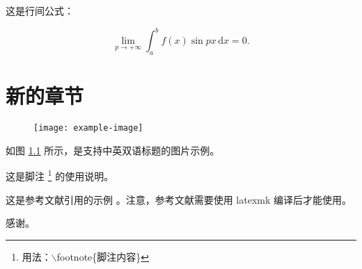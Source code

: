 \documentclass{ecnuthesis}
\begin{document}
这是行间公式：

\[
  \lim_{p\to+\infty}\int_{a}^{b}f(x)\sin{px}\,\mathrm{d}x = 0.
\]

\chapter{新的章节}

\blindtext

\blindtext

\blindtext

\blindtext

\begin{figure}
    \centering
    \texttt{[image: example-image]}
    \label{example}
  \end{figure}

如图 \ref{example} 所示，是支持中英双语标题的图片示例。

这是脚注 \footnote{用法：\ttfamily$\backslash$footnote\{脚注内容\}} 的使用说明。

这是参考文献引用的示例 \cite{Yang_Hy200215, Zheng_wb200108, Altman1997}。注意，参考文献需要使用 {\ttfamily latexmk} 编译后才能使用。

\backmatter
\PrintReference

\begin{appendix}
  \blindtext
\end{appendix}

\begin{acknowledgement}
  感谢。
\end{acknowledgement}
\end{document}

